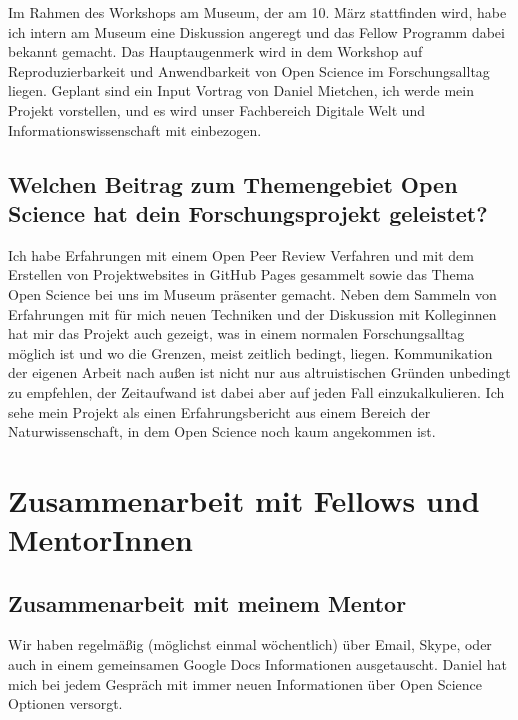 \documentclass[11pt,a4paper]{article}
\begin{document}
Im Rahmen des Workshops am Museum, der am 10. März stattfinden wird, habe ich intern am Museum eine Diskussion angeregt und das Fellow Programm dabei bekannt gemacht. Das Hauptaugenmerk wird in dem Workshop auf Reproduzierbarkeit und Anwendbarkeit von Open Science im Forschungsalltag liegen. Geplant sind ein Input Vortrag von Daniel Mietchen, ich werde mein Projekt vorstellen, und es wird unser Fachbereich Digitale Welt und Informationswissenschaft mit einbezogen.


\subsection{Welchen Beitrag zum Themengebiet Open Science hat dein Forschungsprojekt geleistet?}%
Ich habe Erfahrungen mit einem Open Peer Review Verfahren und mit dem Erstellen von Projektwebsites in GitHub Pages gesammelt sowie das Thema Open Science bei uns im Museum präsenter gemacht. Neben dem Sammeln von Erfahrungen mit für mich neuen Techniken und der Diskussion mit Kolleginnen hat mir das Projekt auch gezeigt, was in einem normalen Forschungsalltag möglich ist und wo die Grenzen, meist zeitlich bedingt, liegen. Kommunikation der eigenen Arbeit nach außen ist nicht nur aus altruistischen Gründen unbedingt zu empfehlen, der Zeitaufwand ist dabei aber auf jeden Fall einzukalkulieren. Ich sehe mein Projekt als einen Erfahrungsbericht aus einem Bereich der Naturwissenschaft, in dem Open Science noch kaum angekommen ist.



\section{Zusammenarbeit mit Fellows und MentorInnen}%
\subsection{Zusammenarbeit mit meinem Mentor}%
Wir haben regelmäßig (möglichst einmal wöchentlich) über Email, Skype, oder auch in einem gemeinsamen Google Docs Informationen ausgetauscht. Daniel hat mich bei jedem Gespräch mit immer neuen Informationen über Open Science Optionen versorgt.
\end{document}
